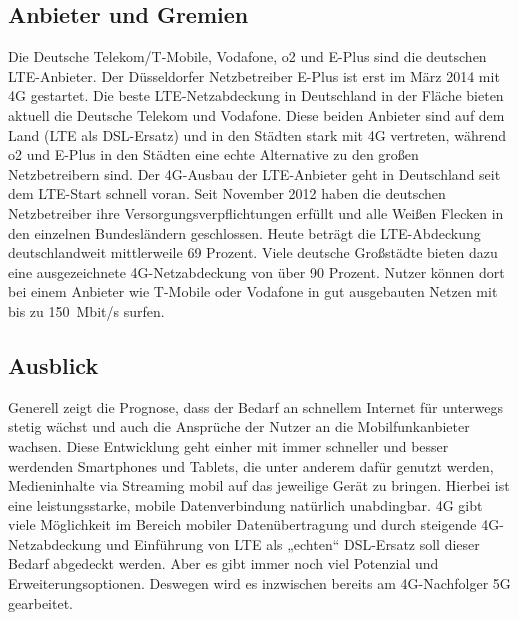 \begin{multicols}{3}
\subsection*{Anbieter und Gremien} 

Die Deutsche Telekom/T-Mobile, Vodafone, o2 und E-Plus sind die deutschen LTE-Anbieter. Der Düsseldorfer Netzbetreiber E-Plus ist erst im März 2014 mit 4G gestartet. Die beste LTE-Netzabdeckung in Deutschland in der Fläche bieten aktuell die Deutsche Telekom und Vodafone. Diese beiden Anbieter sind auf dem Land (LTE als DSL-Ersatz) und in den Städten stark mit 4G vertreten, während o2 und E-Plus in den Städten eine echte Alternative zu den großen Netzbetreibern sind.
Der 4G-Ausbau der LTE-Anbieter geht in Deutschland seit dem LTE-Start schnell voran. Seit November 2012 haben die deutschen Netzbetreiber ihre Versorgungsverpflichtungen erfüllt und alle Weißen Flecken in den einzelnen Bundesländern geschlossen. Heute beträgt die LTE-Abdeckung deutschlandweit mittlerweile 69 Prozent. Viele deutsche Großstädte bieten dazu eine ausgezeichnete 4G-Netzabdeckung von über 90 Prozent. Nutzer können dort bei einem Anbieter wie T-Mobile oder Vodafone in gut ausgebauten Netzen mit bis zu \SI{150}{Mbit/s} surfen. ~\cite{4GLTE.7}

\subsection*{Ausblick}
Generell zeigt die Prognose, dass der Bedarf an schnellem Internet für unterwegs stetig wächst und auch die Ansprüche der Nutzer an die Mobilfunkanbieter wachsen. Diese Entwicklung geht einher mit immer schneller und besser werdenden Smartphones und Tablets, die unter anderem dafür genutzt werden, Medieninhalte via Streaming mobil auf das jeweilige Gerät zu bringen. Hierbei ist eine leistungsstarke, mobile Datenverbindung natürlich unabdingbar. 4G gibt viele Möglichkeit im Bereich mobiler Datenübertragung und durch steigende 4G-Netzabdeckung und Einführung von LTE als „echten“ DSL-Ersatz soll dieser Bedarf abgedeckt werden. Aber es gibt immer noch viel Potenzial und Erweiterungsoptionen. Deswegen wird es inzwischen bereits am 4G-Nachfolger 5G gearbeitet. 


\printbibliography[segment=14,heading=subbibliography]
\end{multicols}


\newpage